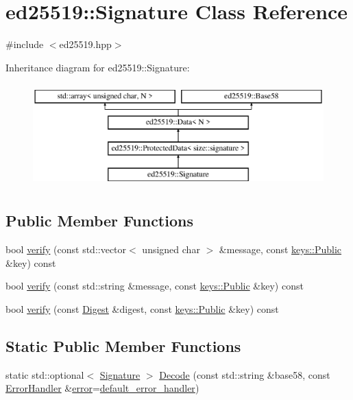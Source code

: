 \hypertarget{classed25519_1_1_signature}{}\section{ed25519\+::Signature Class Reference}
\label{classed25519_1_1_signature}


{\ttfamily \#include $<$ed25519.\+hpp$>$}

Inheritance diagram for ed25519\+::Signature\+:\begin{figure}[H]
\begin{center}
\leavevmode
\includegraphics[height=4.000000cm]{classed25519_1_1_signature}
\end{center}
\end{figure}
\subsection*{Public Member Functions}
\begin{DoxyCompactItemize}
\item 
bool \mbox{\hyperlink{classed25519_1_1_signature_aca2ff60a3e305730cd62e7005b92cfef}{verify}} (const std\+::vector$<$ unsigned char $>$ \&message, const \mbox{\hyperlink{classed25519_1_1keys_1_1_public}{keys\+::\+Public}} \&key) const
\item 
bool \mbox{\hyperlink{classed25519_1_1_signature_a365b186127ea5150dd233c9c89ac4faf}{verify}} (const std\+::string \&message, const \mbox{\hyperlink{classed25519_1_1keys_1_1_public}{keys\+::\+Public}} \&key) const
\item 
bool \mbox{\hyperlink{classed25519_1_1_signature_a906ffca7764e7879438a9c60d96ff207}{verify}} (const \mbox{\hyperlink{classed25519_1_1_digest}{Digest}} \&digest, const \mbox{\hyperlink{classed25519_1_1keys_1_1_public}{keys\+::\+Public}} \&key) const
\end{DoxyCompactItemize}
\subsection*{Static Public Member Functions}
\begin{DoxyCompactItemize}
\item 
static std\+::optional$<$ \mbox{\hyperlink{classed25519_1_1_signature}{Signature}} $>$ \mbox{\hyperlink{classed25519_1_1_signature_ab25f6998f84d92166a03612587420f2f}{Decode}} (const std\+::string \&base58, const \mbox{\hyperlink{namespaceed25519_a6ba572942b3c18591fc869d52a6b16e6}{Error\+Handler}} \&\mbox{\hyperlink{namespaceed25519_ac93d0b5156eaca22197055e902920bc4}{error}}=\mbox{\hyperlink{namespaceed25519_a7c7bb6ed17541162959c33ed3e3b15fb}{default\+\_\+error\+\_\+handler}})
\end{DoxyCompactItemize}
